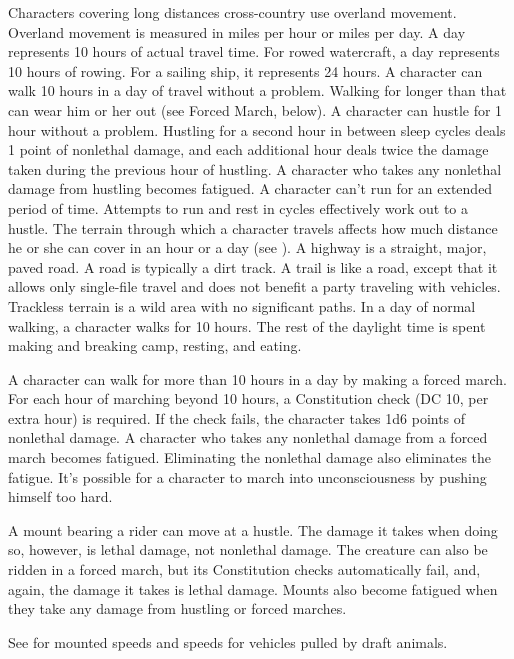 Characters covering long distances cross-country use overland movement. Overland movement is measured in miles per hour or miles per day. A day represents 10 hours of actual travel time. For rowed watercraft, a day represents 10 hours of rowing. For a sailing ship, it represents 24 hours.
 A character can walk 10 hours in a day of travel without a problem. Walking for longer than that can wear him or her out (see Forced March, below).
 A character can hustle for 1 hour without a problem. Hustling for a second hour in between sleep cycles deals 1 point of nonlethal damage, and each additional hour deals twice the damage taken during the previous hour of hustling. A character who takes any nonlethal damage from hustling becomes fatigued.
 A character can't run for an extended period of time. Attempts to run and rest in cycles effectively work out to a hustle.
 The terrain through which a character travels affects how much distance he or she can cover in an hour or a day (see ). A highway is a straight, major, paved road. A road is typically a dirt track. A trail is like a road, except that it allows only single-file travel and does not benefit a party traveling with vehicles. Trackless terrain is a wild area with no significant paths.
 In a day of normal walking, a character walks for 10 hours. The rest of the daylight time is spent making and breaking camp, resting, and eating.

A character can walk for more than 10 hours in a day by making a forced march. For each hour of marching beyond 10 hours, a Constitution check (DC 10,  per extra hour) is required. If the check fails, the character takes 1d6 points of nonlethal damage. A character who takes any nonlethal damage from a forced march becomes fatigued. Eliminating the nonlethal damage also eliminates the fatigue. It's possible for a character to march into unconsciousness by pushing himself too hard.

 A mount bearing a rider can move at a hustle. The damage it takes when doing so, however, is lethal damage, not nonlethal damage. The creature can also be ridden in a forced march, but its Constitution checks automatically fail, and, again, the damage it takes is lethal damage. Mounts also become fatigued when they take any damage from hustling or forced marches.

See  for mounted speeds and speeds for vehicles pulled by draft animals.

